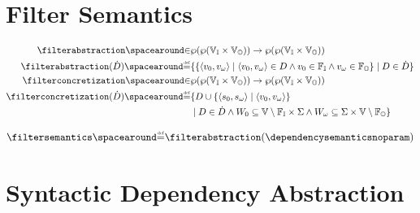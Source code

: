 \section{Filter Semantics}

\begin{definition}
  \begin{align*}
    \filterabstraction \IN& \inputoutputtype \to \filtertype \\
    \filterabstraction(\defsetofsetofdependencies) \DefeQ& \setdef{
      \setdef{
        \inputoutputtuple{\defvalue}
      }{
        \inputoutputtuple{\defvalue}\in\defsetofdependencies
        \land \retrieveinput\defvalue \in \inputfilter
        \land \retrieveoutput\defvalue \in \outputfilter
      }
    }{
      \defsetofdependencies \in \defsetofsetofdependencies
    }\\
    \filterconcretization \IN& \filtertype \to \inputoutputtype \\
    \filterconcretization(\defsetofsetofdependencies) \DefeQ& \setdef{
      \defsetofdependencies \setjoin \setdef{
        \inputoutputtuple{\defstate}
      }{
        \inputoutputtuple{\defvalue}
      }
      \\&
    }{
      \defsetofdependencies\in\defsetofsetofdependencies
      \land
      \retrieveinput{W} \subseteq \pair{\values \setminus \inputfilter}{\state}
      \land
      \retrieveoutput{W} \subseteq \pair{\state}{\values \setminus \outputfilter}
    }
  \end{align*}
\end{definition}


\begin{definition}
  \begin{align*}
    \filtersemantics\DefeQ\filterabstraction(\dependencysemanticsnoparam)
  \end{align*}
\end{definition}






\section{Syntactic Dependency Abstraction}
